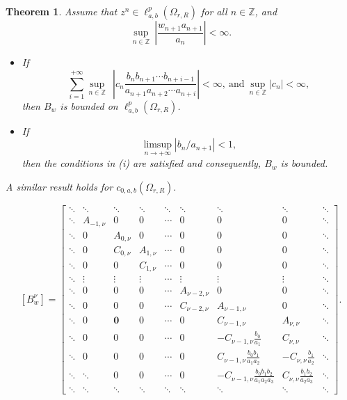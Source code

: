\documentclass[10pt,a4paper]{amsart}
\newtheorem{theorem}{Theorem}
\begin{document}
   \begin{theorem}\label{decomposition1}
  Assume that $z^n\in \ell^p_{a,b}(\Omega_{r,R})$ for all $n\in \mathbb{Z}$, and 
  \begin{equation}\label{rr}
  \sup_{n\in \mathbb{Z}}~\left\lvert\frac{ w_{n+1}a_{n+1}}{a_{n}}\right\rvert<\infty.
  \end{equation}
  \begin{itemize}
  \item[(i)] If 
  \begin{equation}\label{ss}
  \sum_{i=1}^{+\infty}\sup_{n\in \mathbb{Z}}~~\left\lvert c_{n}\frac{b_{n}b_{n+1}\cdots b_{n+i-1}}{a_{n+1}a_{n+2}\cdots a_{n+i}}\right\rvert<\infty, ~\text{and}~ \sup_{n\in \mathbb{Z}}|c_n|<\infty,
  \end{equation}
  then $B_{w}$ is bounded on $\ell^{p}_{a,b}(\Omega_{r,R})$.
\item[(ii)] If 
\begin{equation}\label{tt}
\limsup_{ n\rightarrow +\infty} \left\lvert b_n/a_{n+1}\right\rvert<1,
\end{equation}
then the conditions in \textnormal{(i)} are satisfied and consequently, $B_w$ is bounded.
   \end{itemize}
   A similar result holds for $c_{0,a,b}(\Omega_{r,R}).$
   \end{theorem}

 \begin{equation}\label{matrix}
  [B_w^{\nu}]=
  \begin{bmatrix}
  \ddots&  \ddots & \ddots & \ddots & \ddots&\ddots&\ddots&\ddots&\ddots\\
   \ddots & A_{-1,\nu}&0&0&\cdots&0&0&0&\ddots\\
   \ddots & 0& A_{0,\nu}&0&\cdots&0&0&0&\ddots\\
  \ddots & 0& C_{0,\nu}&A_{1,\nu}&\cdots&0&0&0&\ddots\\
  \ddots & 0& 0&C_{1,\nu}& \cdots&0&0&0&\ddots\\
  \ddots & \vdots& \vdots&\vdots& \cdots&\vdots&\vdots&\vdots&\ddots\\
\ddots& 0 & 0&0 & \cdots&A_{\nu-2,\nu}&0&0 &\ddots\\
\ddots& 0 & 0 & 0&\cdots&C_{\nu-2,\nu}&A_{\nu-1,\nu}&0&\ddots\\
  \ddots &0&\boxed{\boldsymbol{0}} &0&\cdots &0&C_{\nu-1,\nu}& A_{\nu,\nu}&\ddots\\
	\ddots &0&0& 0&\cdots&0&-C_{\nu-1,\nu}\frac{b_{0}}{a_{1}}& C_{\nu,\nu}&\ddots\\
	\ddots  & 0&0&0 &\cdots&0&C_{\nu-1,\nu}\frac{b_{0}b_{1}}{a_{1}a_{2}}&-C_{\nu,\nu}\frac{b_{1}}{a_{2}}&\ddots\\
 \ddots  & \ddots&0&0&\cdots&0&-C_{\nu-1,\nu}\frac{b_{0}b_{1}b_{2}}{a_{1}a_{2}a_{3}}&C_{\nu,\nu}\frac{b_{1}b_{2}}{a_{2}a_{3}}&\ddots\\
	  \ddots & \ddots&\ddots&\ddots &\ddots&\ddots&\ddots&\ddots&\ddots 
	\end{bmatrix}.
 \end{equation}
\end{document}
